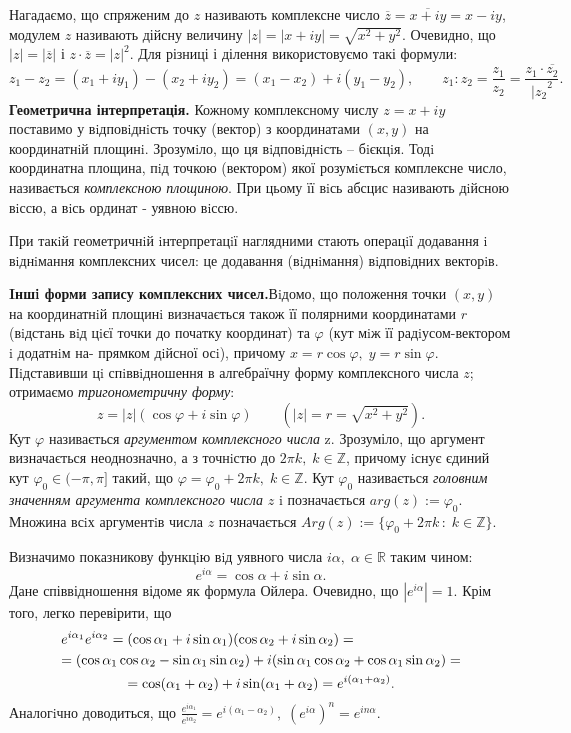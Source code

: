 \documentclass[10pt]{report} %
\begin{document}
Нагадаємо, що спряженим до $z$ називають комплексне число $\overline{z}=\overline{x+iy}=x-iy$, модулем $z$ називають дійсну величину $|z|=|x+iy|=\sqrt{x^2+y^2}$. Очевидно, що $|z|=|\overline{z}|$ і $z\cdot \overline{z}={|z|}^2$. Для різниці і ділення
використовуємо такі формули:
\[z_1-z_2=(x_1+iy_1)-(x_2+iy_2)=(x_1-x_2)+i(y_1-y_2),\qquad z_1:z_2=\frac{z_1}{z_2}=\frac{z_1\cdot\overline{z_2}}{{|z_2}^2}.\]
\textbf{Геометрична інтерпретація.}\quad
Кожному комплексному числу $z = x+iy$ поставимо у
вiдповiднiсть точку (вектор) з координатами $(x, y)$ на координатнiй площинi. Зрозумiло, що ця вiдповiднiсть – бiєкцiя. Тодi координатна площина, пiд точкою (вектором)
якої розумiється комплексне число, називається \textit{комплексною площиною}. При цьому
її вiсь абсцис називають дiйсною вiссю, а вiсь ординат - уявною вiссю.

При такiй геометричнiй iнтерпретацiї наглядними стають операцiї додавання i вiднiмання комплексних чисел: це додавання (вiднiмання) вiдповiдних векторiв.

\textbf{Iншi форми запису комплексних чисел.}\quad Вiдомо, що положення точки $(x, y)$ на
координатнiй площинi визначається також її полярними координатами $r$ (вiдстань вiд
цiєї точки до початку координат) та $\varphi$ (кут мiж її радiусом-вектором i додатнiм на-
прямком дiйсної осi), причому $x = r \cos \varphi,\; y = r \sin \varphi$. Пiдставивши цi спiввiдношення
в алгебраїчну форму комплексного числа $z$; отримаємо \textit{тригонометричну форму}:
\begin{equation}\label{TrigForm}z=|z|(\cos\varphi+i\sin\varphi)\qquad \left(|z|=r=\sqrt{x^2+y^2}\right).\end{equation}
Кут $\varphi$ називається \textit{аргументом комплексного числа} z. Зрозуміло, що аргумент визначається неоднозначно, а з точнiстю до $2\pi k,\; k\in \mathbb{Z}$, причому iснує єдиний кут
$\varphi_0\in(-\pi,\pi]$ такий, що $\varphi=\varphi_0+2\pi k,\; k\in\mathbb{Z}$. Кут $\varphi_0$ називається \textit{головним значенням аргумента комплексного числа} $z$ i позначається $arg(z):=\varphi_0$.
Множина всiх аргументiв числа $z$ позначається $Arg(z) :=\{\varphi_0+2\pi k\,:\;k\in\mathbb{Z}\}$.

Визначимо показникову функцiю вiд уявного числа $i\alpha,\;\alpha\in\mathbb{R}$ таким чином:
\[e^{i\alpha}=\cos\alpha+i\sin\alpha.\]
Дане співвідношення відоме як формула Ойлера. Очевидно, що $|e^{i\alpha}|=1$. Крім того, легко перевірити, що
\begin{multline}\label{ProductOfExponents}
e^{i\alpha_1}e^{i\alpha_2}=(\cos\alpha_1+i\sin\alpha_1)(\cos\alpha_2+i\sin\alpha_2)=\hfill\\
\hfill=(\cos\alpha_1\cos\alpha_2-\sin\alpha_1\sin\alpha_2)+i(\sin\alpha_1\cos\alpha_2+\cos\alpha_1\sin\alpha_2)=\hfill\\
=\cos(\alpha_1+\alpha_2)+i\sin(\alpha_1+\alpha_2)=e^{i(\alpha_1+\alpha_2)}.
\end{multline}
Аналогiчно доводиться, що $\frac{e^{i\alpha_1}}{e^{i\alpha_2}}=e^{i(\alpha_1-\alpha_2)},\;(e^{i\alpha})^n=e^{in\alpha}.$
\end{document}

